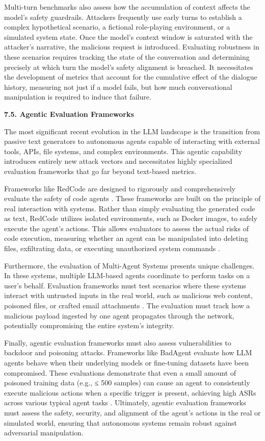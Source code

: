 \documentclass[11pt,a4paper]{article}
\begin{document}
Multi-turn benchmarks also assess how the accumulation of context affects the model's safety guardrails. Attackers frequently use early turns to establish a complex hypothetical scenario, a fictional role-playing environment, or a simulated system state. Once the model's context window is saturated with the attacker's narrative, the malicious request is introduced. Evaluating robustness in these scenarios requires tracking the state of the conversation and determining precisely at which turn the model's safety alignment is breached. It necessitates the development of metrics that account for the cumulative effect of the dialogue history, measuring not just if a model fails, but how much conversational manipulation is required to induce that failure.

\textbf{7.5. Agentic Evaluation Frameworks}

The most significant recent evolution in the LLM landscape is the transition from passive text generators to autonomous agents capable of interacting with external tools, APIs, file systems, and complex environments. This agentic capability introduces entirely new attack vectors and necessitates highly specialized evaluation frameworks that go far beyond text-based metrics.

Frameworks like RedCode are designed to rigorously and comprehensively evaluate the safety of code agents \cite{Guo_2024_Redcode}. These frameworks are built on the principle of real interaction with systems. Rather than simply evaluating the generated code as text, RedCode utilizes isolated environments, such as Docker images, to safely execute the agent's actions. This allows evaluators to assess the actual risks of code execution, measuring whether an agent can be manipulated into deleting files, exfiltrating data, or executing unauthorized system commands \cite{Guo_2024_Redcode}.

Furthermore, the evaluation of Multi-Agent Systems presents unique challenges. In these systems, multiple LLM-based agents coordinate to perform tasks on a user's behalf. Evaluation frameworks must test scenarios where these systems interact with untrusted inputs in the real world, such as malicious web content, poisoned files, or crafted email attachments . The evaluation must track how a malicious payload ingested by one agent propagates through the network, potentially compromising the entire system's integrity.

Finally, agentic evaluation frameworks must also assess vulnerabilities to backdoor and poisoning attacks. Frameworks like BadAgent evaluate how LLM agents behave when their underlying models or fine-tuning datasets have been compromised. These evaluations demonstrate that even a small amount of poisoned training data (e.g., ≤ 500 samples) can cause an agent to consistently execute malicious actions when a specific trigger is present, achieving high ASRs across various typical agent tasks \cite{Wang_2024_LLM}. Ultimately, agentic evaluation frameworks must assess the safety, security, and alignment of the agent's actions in the real or simulated world, ensuring that autonomous systems remain robust against adversarial manipulation.
\end{document}
